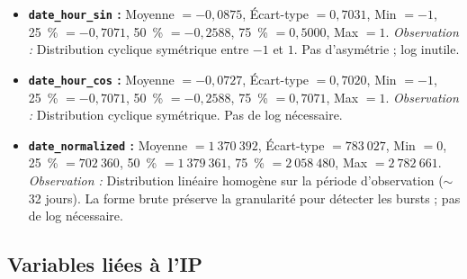 \documentclass[a4paper,12pt]{article}
\begin{document}
\begin{itemize}
  \item \textbf{\texttt{date\_hour\_sin} :} Moyenne $= -0{,}0875$, Écart-type $= 0{,}7031$, Min $= -1$, 25~\% $= -0{,}7071$, 50~\% $= -0{,}2588$, 75~\% $= 0{,}5000$, Max $= 1$. \emph{Observation :} Distribution cyclique symétrique entre $-1$ et $1$. Pas d'asymétrie ; log inutile.
  \item \textbf{\texttt{date\_hour\_cos} :} Moyenne $= -0{,}0727$, Écart-type $= 0{,}7020$, Min $= -1$, 25~\% $= -0{,}7071$, 50~\% $= -0{,}2588$, 75~\% $= 0{,}7071$, Max $= 1$. \emph{Observation :} Distribution cyclique symétrique. Pas de log nécessaire.
  \item \textbf{\texttt{date\_normalized} :} Moyenne $= 1~370~392$, Écart-type $= 783~027$, Min $= 0$, 25~\% $= 702~360$, 50~\% $= 1~379~361$, 75~\% $= 2~058~480$, Max $= 2~782~661$. \emph{Observation :} Distribution linéaire homogène sur la période d'observation ($\sim$32 jours). La forme brute préserve la granularité pour détecter les bursts ; pas de log nécessaire.
\end{itemize}

\subsection{Variables liées à l'IP}
\end{document}
